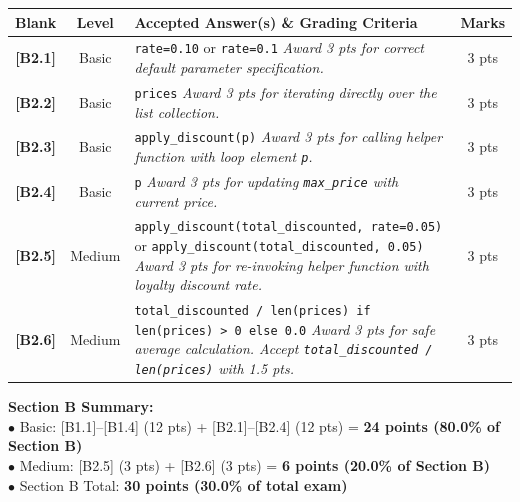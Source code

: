\documentclass[11pt,a4paper]{article}
\begin{document}
\begin{center}
\renewcommand{\arraystretch}{1.15}
\setlength{\tabcolsep}{3.5pt}
\begin{tabularx}{\textwidth}{|c|c|X|c|}
\hline
\textbf{Blank} & \textbf{Level} & \textbf{Accepted Answer(s) \& Grading Criteria} & \textbf{Marks} \\
\hline
\textbf{[B2.1]} & Basic & \texttt{rate=0.10} or \texttt{rate=0.1}\newline
\textit{Award 3 pts for correct default parameter specification.} & 3 pts \\
\hline
\textbf{[B2.2]} & Basic & \texttt{prices}\newline
\textit{Award 3 pts for iterating directly over the list collection.} & 3 pts \\
\hline
\textbf{[B2.3]} & Basic & \texttt{apply\_discount(p)}\newline
\textit{Award 3 pts for calling helper function with loop element \texttt{p}.} & 3 pts \\
\hline
\textbf{[B2.4]} & Basic & \texttt{p}\newline
\textit{Award 3 pts for updating \texttt{max\_price} with current price.} & 3 pts \\
\hline
\textbf{[B2.5]} & Medium & \texttt{apply\_discount(total\_discounted, rate=0.05)} or \texttt{apply\_discount(total\_discounted, 0.05)}\newline
\textit{Award 3 pts for re-invoking helper function with loyalty discount rate.} & 3 pts \\
\hline
\textbf{[B2.6]} & Medium & \texttt{total\_discounted / len(prices) if len(prices) > 0 else 0.0}\newline
\textit{Award 3 pts for safe average calculation. Accept \texttt{total\_discounted / len(prices)} with 1.5 pts.} & 3 pts \\
\hline
\end{tabularx}
\end{center}

\vspace{1mm}
\begin{tcolorbox}[colback=boxbg, colframe=primaryblue!45, arc=1.2mm, left=2.0mm, right=2.0mm, top=1.0mm, bottom=1.0mm]
\small
\textbf{Section B Summary:}\\
$\bullet$ Basic: [B1.1]--[B1.4] (12 pts) + [B2.1]--[B2.4] (12 pts) = \textbf{24 points (80.0\% of Section B)}\\
$\bullet$ Medium: [B2.5] (3 pts) + [B2.6] (3 pts) = \textbf{6 points (20.0\% of Section B)}\\
$\bullet$ Section B Total: \textbf{30 points (30.0\% of total exam)}
\end{tcolorbox}
\end{document}
